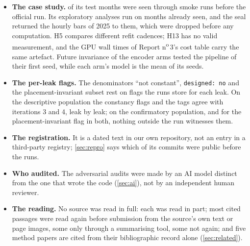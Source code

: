 \documentclass[11pt]{article}
\newcommand{\code}[1]{\texttt{#1}}
\begin{document}
\begin{itemize}[leftmargin=*]
  2026-10-29. In an audit of the bench on 2026-10-28, tests written to prove two holes in the code
  seal read
  BTCUSDT daily vault rows outside the seal: the \NumExposedBars{} bars of the March 2026 raw archive
  and the vault months of the stored file. They assert row counts, and one prints the first bar of
  that archive when it succeeds; no feature, model or decision used these rows. The exposure is
  stated wherever the vault is used. The seal drops every bar from 2026-01-01 on; the protocol's vault period runs to October 2026, and the bars on disk when the months were moved ran to September 2026.
\item \textbf{The case study.} \NumPreviewMonths{} of its \NumTestMonths{} test months were seen
  through smoke runs before the official run. Its exploratory analyses run on months already seen,
  and the seal returned the hourly bars of 2025 to them, which were dropped before any computation.
  H5 compares different refit cadences; H13 has no valid measurement, and the GPU wall times of
  Report n\textsuperscript{o}\,3's cost table carry the same artefact. Future invariance of the
  encoder arms tested the pipeline of their first seed, while each arm's model is the mean of its
  \NumSeeds{} seeds.
\item \textbf{The per-leak flags.} The denominators ``not constant'', \code{designed: no} and the
  placement-invariant subset rest on flags the runs store for each leak. On the descriptive
  population the constancy flags and the tags agree with iterations 3 and 4, leak by leak; on the
  confirmatory population, and for the placement-invariant flag in both, nothing outside the run
  witnesses them.
\item \textbf{The registration.} It is a dated text in our own repository, not an entry in a
  third-party registry; \cref{sec:repro} says which of its commits were public before the runs.
\item \textbf{Who audited.} The adversarial audits were made by an AI model distinct from the one
  that wrote the code (\cref{sec:ai}), not by an independent human reviewer.
\item \textbf{The reading.} No source was read in full: each was read in part; most cited passages
  were read again before submission from the source's own text or page images, some only through a
  summarising tool, some not again; and five method papers are cited from their bibliographic record alone
  (\cref{sec:related}).
\end{itemize}
\end{document}

